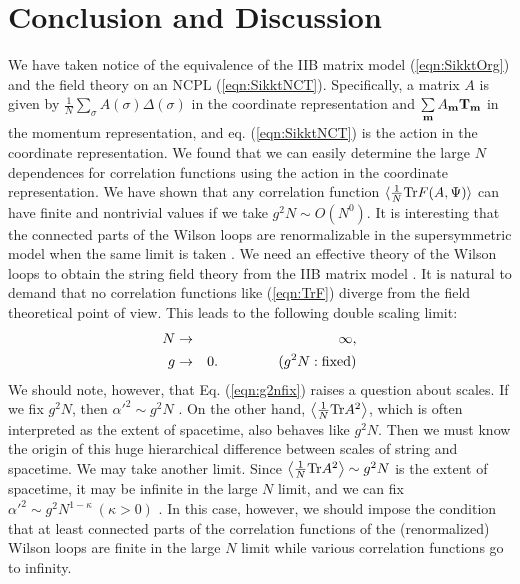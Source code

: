 \documentclass[12pt,a4paper]{article}
\newcommand{\Tr}{\mbox{\rm Tr}}
\begin{document}
\section{Conclusion and Discussion}\label{sec:con}
We have taken notice of the equivalence of the IIB matrix model
(\ref{eqn:SikktOrg}) and the field theory on an NCPL
(\ref{eqn:SikktNCT}).
Specifically, a matrix $A$ is given by $\frac{1}{N} \sum\limits_{\sigma}
A(\sigma) \Delta(\sigma)$ in the coordinate representation and
$\sum\limits_{\bf m} A_{\bf m} {\bf T_m}$ in the momentum
representation, and eq. (\ref{eqn:SikktNCT}) is the action
in the coordinate representation.
We found that we can easily determine the large $N$ dependences
for correlation functions using the action in the coordinate
representation. We have shown that any correlation function
$\langle\frac{1}{N}\Tr F(A,\Psi)\rangle$ can have finite and
nontrivial values if we take $g^2N \sim O(N^0)$.
It is interesting that the connected parts of the
Wilson loops are renormalizable in the supersymmetric model when the
same limit is taken \cite{AABHN}.
We need an effective theory of the Wilson loops to obtain
the string field theory from the IIB matrix model \cite{FKKT}.
It is natural to demand that no correlation functions like
(\ref{eqn:TrF}) diverge from the field theoretical point of view.
This leads to the following double scaling limit:
\begin{eqnarray}
	N &\rightarrow& \infty,\nonumber\\
	g &\rightarrow& 0.\label{eqn:g2nfix}\hspace{10ex}
	(g^2 N : {\rm fixed})
\end{eqnarray}
We should note, however, that Eq. (\ref{eqn:g2nfix}) raises a question
about scales. If we fix $g^2N$, then ${\alpha'}^2\sim g^2N$ \cite{FKKT}.
On the other hand, $\left\langle\frac{1}{N}\Tr A^2\right\rangle$, which
is often interpreted as the extent of spacetime, also behaves like
$g^2N$. Then we must know the origin of this huge hierarchical
difference between scales of string and spacetime.
We may take another limit. Since  $\left\langle\frac{1}{N}\Tr
A^2\right\rangle\sim g^2N$ is the extent of spacetime, it may be
infinite in the large $N$ limit, and we can fix
${\alpha'}^2\sim g^2N^{1-\kappa}\ (\kappa>0)$ \cite{AIKKTT}.
In this case, however, we should impose the condition that at least
connected parts of the correlation functions of the (renormalized)
Wilson loops are finite in the large $N$ limit while various
correlation functions go to infinity.
\end{document}
